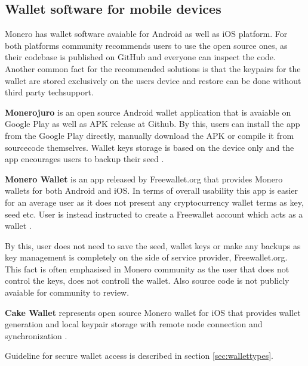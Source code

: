 \documentclass[
  printed, %
  table,   %
  nolof,     %
  nolot,     %
           oneside, color
]{fithesis3}
\begin{document}
\subsection{Wallet software for mobile devices}

Monero has wallet software avaiable for Android as well as iOS platform. For both platforms community recommends users to use the open source ones, as their codebase is published on GitHub and everyone can inspect the code. Another common fact for the recommended solutions is that the keypairs for the wallet are stored exclusively on the users device and restore can be done without third party techsupport.

\textbf{Monerojuro} is an open source Android wallet application that is avaiable on Google Play as well as APK release at Github. By this, users can install the app from the Google Play directly, manually download the APK or compile it from sourcecode themselves. Wallet keys storage is based on the device only and the app encourages users to backup their seed \cite{xmrwalletgithub}.

\textbf{Monero Wallet} is an app released by Freewallet.org that provides Monero wallets for both Android and iOS. In terms of overall usability this app is easier for an average user as it does not present any cryptocurrency wallet terms as key, seed etc. User is instead instructed to create a Freewallet account which acts as a wallet \cite{freewallet}. 

By this, user does not need to save the seed, wallet keys or make any backups as key management is completely on the side of service provider, Freewallet.org. This fact is often emphasised in Monero community as the user that does not control the keys, does not controll the wallet. Also source code is not publicly avaiable for community to review.

\textbf{Cake Wallet} represents open source  Monero wallet for iOS that provides wallet generation and local keypair storage with remote node connection and synchronization \cite{cakewalletgithub}.

Guideline for secure wallet access is described in section \ref{sec:wallettypes}. 
\end{document}
